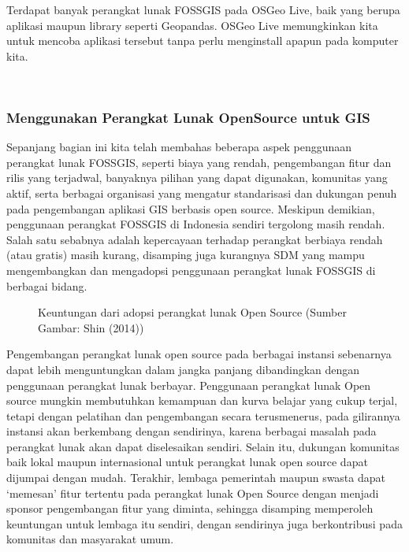 \documentclass[letterpaper,10pt,english]{sphinxmanual}
\let\sphinxpxdimen\pdfpxdimen\else\newdimen\sphinxpxdimen
\begin{document}
Terdapat banyak perangkat lunak FOSS\sphinxhyphen{}GIS pada OSGeo Live, baik yang berupa aplikasi maupun library seperti Geopandas. OSGeo Live memungkinkan kita untuk mencoba aplikasi tersebut tanpa perlu menginstall apapun pada komputer kita.

 


\subsubsection{Menggunakan Perangkat Lunak OpenSource untuk GIS}
\label{\detokenize{sesi1/fossgis:menggunakan-perangkat-lunak-opensource-untuk-gis}}
Sepanjang bagian ini kita telah membahas beberapa aspek penggunaan perangkat lunak FOSS\sphinxhyphen{}GIS, seperti biaya yang rendah, pengembangan fitur dan rilis yang terjadwal, banyaknya pilihan yang dapat digunakan, komunitas yang aktif, serta berbagai organisasi yang mengatur standarisasi dan dukungan penuh pada pengembangan aplikasi GIS berbasis open source. Meskipun demikian, penggunaan perangkat FOSS\sphinxhyphen{}GIS di Indonesia sendiri tergolong masih rendah. Salah satu sebabnya adalah kepercayaan terhadap perangkat berbiaya rendah (atau gratis) masih kurang, disamping juga kurangnya SDM yang mampu mengembangkan dan mengadopsi penggunaan perangkat lunak FOSS\sphinxhyphen{}GIS di berbagai bidang.

\begin{figure}[htbp]
\centering
\capstart

\noindent\sphinxincludegraphics[height=300\sphinxpxdimen]{{2020-12-07-13-09-54}.png}
\caption{Keuntungan dari adopsi perangkat lunak Open Source (Sumber Gambar: Shin (2014))}\label{\detokenize{sesi1/fossgis:adopsi}}\end{figure}

Pengembangan perangkat lunak open source pada berbagai instansi sebenarnya dapat lebih menguntungkan dalam jangka panjang dibandingkan dengan penggunaan perangkat lunak berbayar. Penggunaan perangkat lunak Open source mungkin membutuhkan kemampuan dan kurva belajar yang cukup terjal, tetapi dengan pelatihan dan pengembangan secara terus\sphinxhyphen{}menerus, pada gilirannya instansi akan berkembang dengan sendirinya, karena berbagai masalah pada perangkat lunak akan dapat diselesaikan sendiri. Selain itu, dukungan komunitas baik lokal maupun internasional untuk perangkat lunak open source dapat dijumpai dengan mudah. Terakhir, lembaga pemerintah maupun swasta dapat ‘memesan’ fitur tertentu pada perangkat lunak Open Source dengan menjadi sponsor pengembangan fitur yang diminta, sehingga disamping memperoleh keuntungan untuk lembaga itu sendiri, dengan sendirinya juga berkontribusi pada komunitas dan masyarakat umum.
\end{document}
